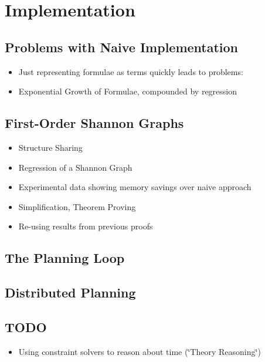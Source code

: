 


\chapter{Implementation}

\label{ch:implementation} %



\section{Problems with Naive Implementation}

\begin{itemize}
\item Just representing formulae as terms quickly leads to problems: 
\item Exponential Growth of Formulae, compounded by regression 
\end{itemize}

\section{First-Order Shannon Graphs}

\begin{itemize}
\item Structure Sharing 
\item Regression of a Shannon Graph 
\item Experimental data showing memory savings over naive approach 
\item Simplification, Theorem Proving 
\item Re-using results from previous proofs 
\end{itemize}

\section{The Planning Loop}


\section{Distributed Planning}


\section{TODO}

\begin{itemize}
\item Using constraint solvers to reason about time (\char`\"{}Theory Reasoning\char`\"{}) 
\end{itemize}
